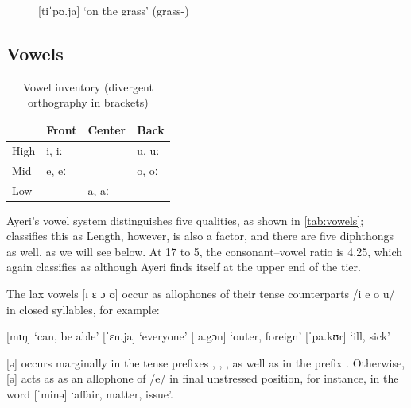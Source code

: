 \begin{figure}[h]
\ex\label{ex:diphya}
	 [tiˈpʊ.ja] `on the grass' 
		(grass-\Loc{})
\xe
\end{figure}

%
%

\subsection{Vowels}
\label{subsec:vowels}

%
\begin{table}\centering
\caption[Vowel inventory]{Vowel inventory (divergent orthography in brackets)}
\begin{tabu} to .67\linewidth{B[1] X[2c] X[2c] X[2c]}
\toprule\tableheaderfont

	& Front
	& Center
	& Back
	\\

\toprule

High
	& i, iː 
	&
	& u, uː 
	\\
	\midrule

Mid
	& e, eː 
	&
	& o, oː 
	\\
	\midrule

Low
	&
	& a, aː 
	&
	\\

\bottomrule
\end{tabu}
\label{tab:vowels}
\end{table}

Ayeri's vowel system distinguishes five qualities, as shown in
\autoref{tab:vowels}; \citet{wals2} classifies this as 
Length, however, is also a factor, and there are five diphthongs as well, as we
will see below. At 17 to 5, the consonant--vowel ratio is 4.25, which
\citet{wals3} again classifies as  although Ayeri finds
itself at the upper end of the tier.

%
The lax vowels [ɪ ɛ ɔ ʊ] occur as allophones of their tense counterparts 
/i e o u/ in closed syllables, for example:

\pex
	\a {} [mɪŋ] `can, be able'
	\a {} [ˈɛn.ja] `everyone'
	\a {} [ˈa.gɔn] `outer, foreign'
	\a {} [ˈpa.kʊr] `ill, sick'
\xe

[ə]  occurs marginally in the tense prefixes ,
, , as well as in the prefix
. Otherwise, [ə]  acts as as an
allophone of /e/ in final unstressed position, for instance, in the word
 [ˈminə] `affair, matter, issue'.


